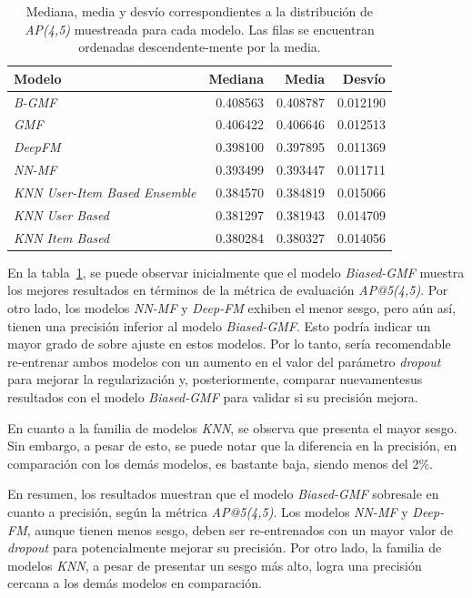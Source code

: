\documentclass[11pt,a4paper,twoside]{thesis}
\begin{document}
\begin{table}[!htb]
	\centering
	\footnotesize
	\begin{tabular}{lrrr}
		\hline
		Modelo                                & Mediana  & Media    & Desvío   \\
		\hline
		\textit{B-GMF}                        & 0.408563 & 0.408787 & 0.012190 \\
		\textit{GMF}                          & 0.406422 & 0.406646 & 0.012513 \\
		\textit{DeepFM}                       & 0.398100 & 0.397895 & 0.011369 \\
		\textit{NN-MF}                        & 0.393499 & 0.393447 & 0.011711 \\
		\textit{KNN User-Item Based Ensemble} & 0.384570 & 0.384819 & 0.015066 \\
		\textit{KNN User Based}               & 0.381297 & 0.381943 & 0.014709 \\
		\textit{KNN Item Based}               & 0.380284 & 0.380327 & 0.014056 \\
		\hline
	\end{tabular}
	\caption{
		Mediana, media y desvío correspondientes a la distribución de
		\textit{AP(4,5)} muestreada para cada modelo.
		Las filas se encuentran ordenadas descendente-mente por la media.}
	\label{table:ap_at_k}
\end{table}

En la tabla~\ref{table:ap_at_k}, se puede observar inicialmente que el modelo
\textit{Biased-GMF} muestra los mejores resultados en términos de la métrica de
evaluación \textit{AP@5(4,5)}. Por otro lado, los modelos \textit{NN-MF} y
\textit{Deep-FM} exhiben el menor sesgo, pero aún así, tienen una precisión
inferior al modelo \textit{Biased-GMF}. Esto podría indicar un mayor grado de
sobre ajuste en estos modelos. Por lo tanto, sería recomendable re-entrenar
ambos modelos con un aumento en el valor del parámetro \textit{dropout} para
mejorar la regularización y, posteriormente, comparar nuevamentesus resultados
con el modelo \textit{Biased-GMF} para validar si su precisión mejora.

En cuanto a la familia de modelos \textit{KNN}, se observa que presenta el
mayor sesgo. Sin embargo, a pesar de esto, se puede notar que la diferencia en
la precisión, en comparación con los demás modelos, es bastante baja, siendo
menos del 2\%.

En resumen, los resultados muestran que el modelo \textit{Biased-GMF} sobresale
en cuanto a precisión, según la métrica \textit{AP@5(4,5)}. Los modelos
\textit{NN-MF} y \textit{Deep-FM}, aunque tienen menos sesgo, deben ser
re-entrenados con un mayor valor de \textit{dropout} para potencialmente
mejorar su precisión. Por otro lado, la familia de modelos \textit{KNN}, a
pesar de presentar un sesgo más alto, logra una precisión cercana a los demás
modelos en comparación.
\end{document}
